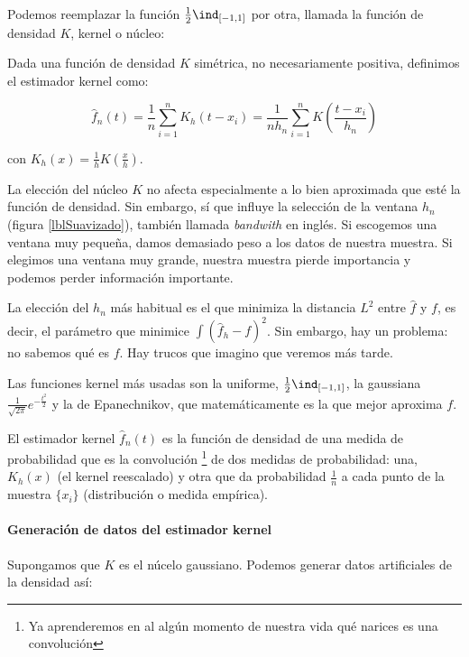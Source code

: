 \documentclass{apuntes}
\begin{document}
Podemos reemplazar la función $\frac{1}{2}\ind_{[-1, 1]}$ por otra, llamada la función de densidad $K$, kernel o núcleo:

\begin{defn}
Dada una función de densidad $K$ simétrica, no necesariamente positiva, definimos el estimador kernel como:

\[ \hat{f}_n(t) = \frac{1}{n}\sum_{i=1}^n K_h (t - x_i)  = \frac{1}{nh_n} \sum_{i=1}^n K\left(\frac{t-x_i}{h_n}\right) \]

con $K_h(x) = \frac{1}{h}K(\frac{x}{h})$.
\end{defn}

La elección del núcleo $K$ no afecta especialmente a lo bien aproximada que esté la función de densidad. Sin embargo, sí que influye la selección de la ventana $h_n$ (figura \ref{lblSuavizado}), también llamada \textit{bandwith} en inglés.  Si escogemos una ventana muy pequeña, damos demasiado peso a los datos de nuestra muestra. Si elegimos una ventana muy grande, nuestra muestra pierde importancia y podemos perder información importante.

La elección del $h_n$ más habitual es el que minimiza la distancia $L^2$ entre $\hat{f}$ y $f$, es decir, el parámetro que minimice $\displaystyle\int\left(\hat{f}_h-f\right)^2$. Sin embargo, hay un problema: no sabemos qué es $f$. Hay trucos que imagino que veremos más tarde.


Las funciones kernel más usadas son la uniforme, $\frac{1}{2}\ind_{[-1, 1]}$, la gaussiana $\frac{1}{\sqrt{2 \pi}}e^{-\frac{t^2}{2}}$ y la de Epanechnikov, que matemáticamente es la que mejor aproxima $f$.

El estimador kernel $\hat{f}_n(t)$ es la función de densidad de una medida de probabilidad que es la convolución \footnote{Ya aprenderemos en al algún momento de nuestra vida qué narices es una convolución} de dos medidas de probabilidad: una, $K_h(x)$ (el kernel reescalado) y otra que da probabilidad $\frac{1}{n}$ a cada punto de la muestra $\{x_i\}$ (distribución o medida empírica).

\paragraph{Generación de datos del estimador kernel} Supongamos que $K$ es el núcelo gaussiano. Podemos generar datos artificiales de la densidad así:
\end{document}
